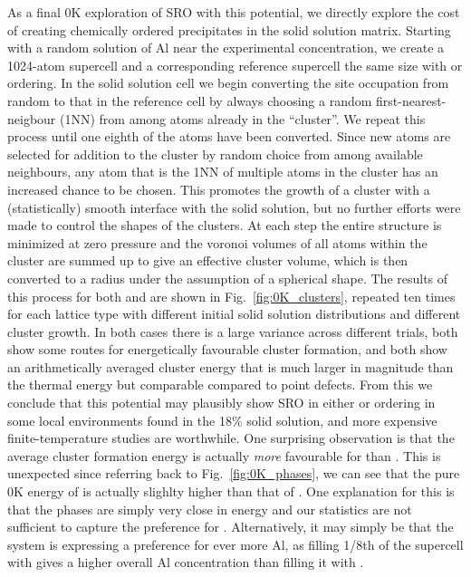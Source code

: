 As a final 0K exploration of SRO with this potential, we directly explore the cost of creating chemically ordered precipitates in the solid solution matrix.
Starting with a random solution of Al near the experimental concentration, we create a 1024-atom supercell and a corresponding reference supercell the same size with \DOTHREE or \BTWO ordering.
In the solid solution cell we begin converting the site occupation from random to that in the reference cell by always choosing a random first-nearest-neigbour (1NN) from among atoms already in the ``cluster''.
We repeat this process until one eighth of the atoms have been converted.
Since new atoms are selected for addition to the cluster by random choice from among available neighbours, any atom that is the 1NN of multiple atoms in the cluster has an increased chance to be chosen.
This promotes the growth of a cluster with a (statistically) smooth interface with the solid solution, but no further efforts were made to control the shapes of the clusters.
At each step the entire structure is minimized at zero pressure and the voronoi volumes of all atoms within the cluster are summed up to give an effective cluster volume, which is then converted to a radius under the assumption of a spherical shape.
The results of this process for both \DOTHREE and \BTWO are shown in Fig.~\ref{fig:0K_clusters}, repeated ten times for each lattice type with different initial solid solution distributions and different cluster growth.
In both cases there is a large variance across different trials, both show some routes for energetically favourable cluster formation, and both show an arithmetically averaged cluster energy that is much larger in magnitude than the thermal energy but comparable compared to point defects.
From this we conclude that this potential may plausibly show SRO in either \DOTHREE or \BTWO ordering in some local environments found in the 18\% solid solution, and more expensive finite-temperature studies are worthwhile.
One surprising observation is that the average cluster formation energy is actually \emph{more} favourable for \BTWO than \DOTHREE.
This is unexpected since referring back to Fig.~\ref{fig:0K_phases}, we can see that the pure 0K energy of \BTWO is actually slighlty higher than that of \DOTHREE.
One explanation for this is that the phases are simply very close in energy and our statistics are not sufficient to capture the preference for \DOTHREE.
Alternatively, it may simply be that the system is expressing a preference for ever more Al, as filling 1/8th of the supercell with \BTWO gives a higher overall Al concentration than filling it with \DOTHREE.
